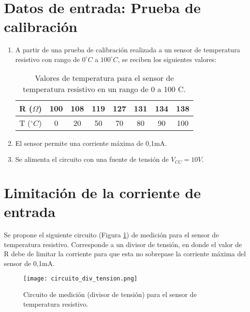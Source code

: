 \documentclass[journal,trans]{IEEEtran}
\begin{document}
\section{Datos de entrada: Prueba de calibración}
\begin{enumerate}
    \item A partir de una prueba de calibración realizada a un sensor de temperatura resistivo con rango de $0^{\circ}C$ a $100^{\circ}C$, se reciben los siguientes valores:

\begin{table}[htb]
    \begin{center}
        \caption{Valores de temperatura para el sensor de temperatura resistivo en un rango de 0 a 100 C.}
        \label{tab:prueba_calibracion}
        \begin{tabular}{c | c | c | c | c | c | c | c}
            \hline
            R ($\Omega$) & 100 & 108 & 119 & 127 & 131 & 134 & 138 \\
            \hline
            T ($^{\circ}C$) & 0 & 20 & 50 & 70 & 80 & 90 & 100  \\
            \hline
        \end{tabular}
    \end{center}
\end{table}

    \item El sensor permite una corriente máxima de 0,1mA.

    \item Se alimenta el circuito con una fuente de tensión de $V_{CC} = 10 V$.

\end{enumerate}

\section{Limitación de la corriente de entrada}
Se propone el siguiente circuito (Figura \ref{fig:circuito_div_tension}) de medición para el sensor de temperatura resistivo. Corresponde a un divisor de tensión, en donde el valor de R debe de limitar la corriente para que esta no sobrepase la corriente máxima del sensor de 0,1mA.

\begin{figure}[hbtp]
	\centering
	\texttt{[image: circuito\_div\_tension.png]}
	\caption[Figura 1]{Circuito de medición (divisor de tensión) para el sensor de temperatura resistivo.}
    \label{fig:circuito_div_tension}
\end{figure}
\end{document}
